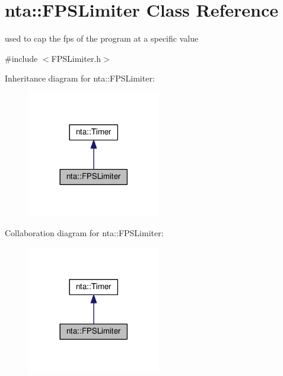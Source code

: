 \hypertarget{classnta_1_1FPSLimiter}{}\section{nta\+:\+:F\+P\+S\+Limiter Class Reference}
\label{classnta_1_1FPSLimiter}


used to cap the fps of the program at a specific value  




{\ttfamily \#include $<$F\+P\+S\+Limiter.\+h$>$}



Inheritance diagram for nta\+:\+:F\+P\+S\+Limiter\+:\nopagebreak
\begin{figure}[H]
\begin{center}
\leavevmode
\includegraphics[width=165pt]{de/d03/classnta_1_1FPSLimiter__inherit__graph}
\end{center}
\end{figure}


Collaboration diagram for nta\+:\+:F\+P\+S\+Limiter\+:\nopagebreak
\begin{figure}[H]
\begin{center}
\leavevmode
\includegraphics[width=165pt]{de/da2/classnta_1_1FPSLimiter__coll__graph}
\end{center}
\end{figure}
